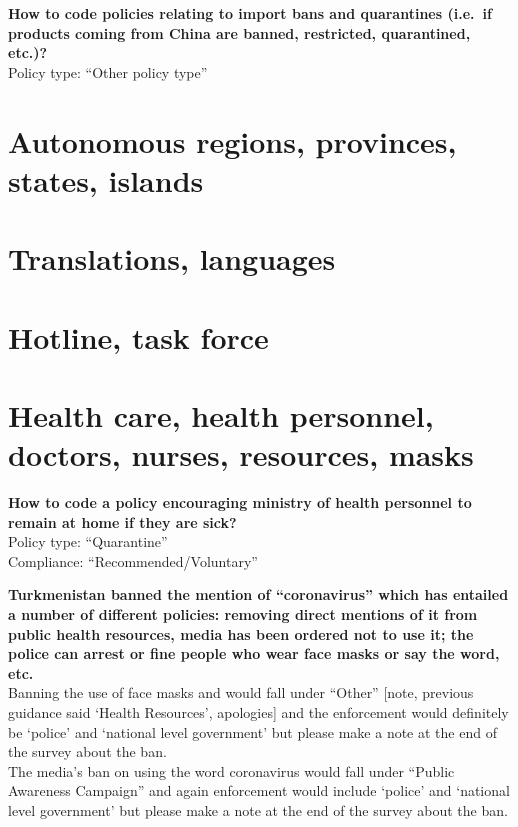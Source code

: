 \documentclass[
]{book}
\begin{document}
\textbf{How to code policies relating to import bans and quarantines (i.e.~if products coming from China are banned, restricted, quarantined, etc.)?}\\
Policy type: ``Other policy type''

\hypertarget{autonomous-regions-provinces-states-islands}{%
\section{Autonomous regions, provinces, states, islands}\label{autonomous-regions-provinces-states-islands}}

\hypertarget{translations-languages}{%
\section{Translations, languages}\label{translations-languages}}

\hypertarget{hotline-task-force}{%
\section{Hotline, task force}\label{hotline-task-force}}

\hypertarget{health-care-health-personnel-doctors-nurses-resources-masks}{%
\section{Health care, health personnel, doctors, nurses, resources, masks}\label{health-care-health-personnel-doctors-nurses-resources-masks}}

\textbf{How to code a policy encouraging ministry of health personnel to remain at home if they are sick?}\\
Policy type: ``Quarantine''\\
Compliance: ``Recommended/Voluntary''

\textbf{Turkmenistan banned the mention of ``coronavirus'' which has entailed a number of different policies: removing direct mentions of it from public health resources, media has been ordered not to use it; the police can arrest or fine people who wear face masks or say the word, etc.}\\
Banning the use of face masks and would fall under ``Other'' {[}note, previous guidance said `Health Resources', apologies{]} and the enforcement would definitely be `police' and `national level government' but please make a note at the end of the survey about the ban.\\
The media's ban on using the word coronavirus would fall under ``Public Awareness Campaign'' and again enforcement would include `police' and `national level government' but please make a note at the end of the survey about the ban.
\end{document}
